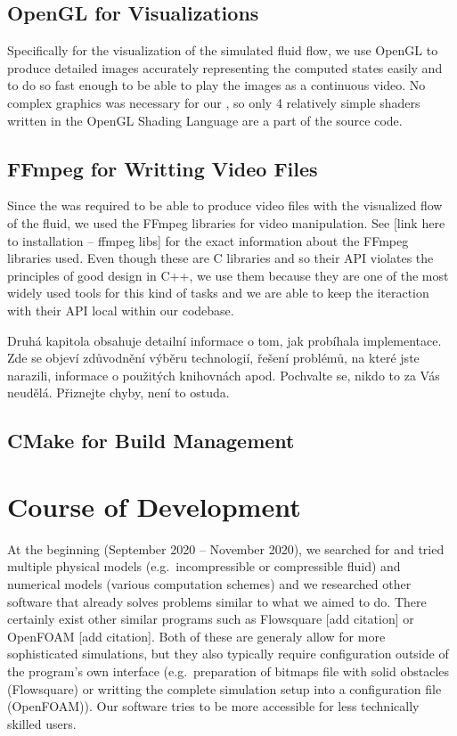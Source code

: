 \documentclass[11pt,a4paper,twoside,openright]{report}
\begin{document}
\subsection{OpenGL for Visualizations}
Specifically for the visualization of the simulated fluid flow, we use OpenGL to produce detailed images accurately representing the computed states easily and to do so fast enough to be able to play the images as a continuous video. No complex graphics was necessary for our \software{}, so only 4 relatively simple shaders written in the OpenGL Shading Language are a part of the source code.

\subsection{FFmpeg for Writting Video Files}
Since the \software{} was required to be able to produce video files with the visualized flow of the fluid, we used the FFmpeg libraries for video manipulation. See [link here to installation -- ffmpeg libs] for the exact information about the FFmpeg libraries used. Even though these are C libraries and so their API violates the principles of good design in C++, we use them because they are one of the most widely used tools for this kind of tasks and we are able to keep the iteraction with their API local within our codebase.

Druhá kapitola obsahuje detailní informace o tom, jak probíhala implementace. Zde se objeví zdůvodnění výběru technologií, řešení problémů, na které jste narazili, informace o použitých knihovnách apod. Pochvalte se, nikdo to za Vás neudělá. Přiznejte chyby, není to ostuda.

\subsection{CMake for Build Management}

\section{Course of Development}
At the beginning (September 2020 -- November 2020), we searched for and tried multiple physical models (e.g.\ incompressible or compressible fluid) and numerical models (various computation schemes) and we researched other software that already solves problems similar to what we aimed to do. There certainly exist other similar programs such as Flowsquare [add citation] or OpenFOAM [add citation]. Both of these are generaly allow for more sophisticated simulations, but they also typically require configuration outside of the program's own interface (e.g.\ preparation of bitmaps file with solid obstacles (Flowsquare) or writting the complete simulation setup into a configuration file (OpenFOAM)). Our software tries to be more accessible for less technically skilled users.
\end{document}
